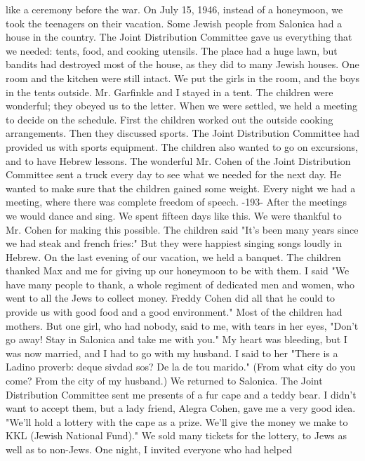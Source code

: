 like a ceremony before the war. 
On July 15, 1946, instead of a honeymoon, we took the teenagers on their vacation. 
Some Jewish people from Salonica had a house in the country. The Joint Distribution 
Committee gave us everything that we needed: tents, food, and cooking utensils. The 
place had a huge lawn, but bandits had destroyed most of the house, as they did to many 
Jewish houses. One room and the kitchen were still intact. 
We put the girls in the room, and the boys in the tents outside. Mr. Garfinkle and 
I stayed in a tent. The children were wonderful; they obeyed us to the letter. When 
we were settled, we held a meeting to decide on the schedule. First the children worked out the outside cooking arrangements. Then they discussed sports. The Joint Distribution Committee had provided us with sports equipment. The children also wanted 
to go on excursions, and to have Hebrew lessons. 
The wonderful Mr. Cohen of the Joint Distribution Committee sent a truck every day 
to see what we needed for the next day. He wanted to make sure that the children gained 
some weight. Every night we had a meeting, where there was complete freedom of speech. 
-193- 
After the meetings we would dance and sing. We spent fifteen days like this. We were 
thankful to Mr. Cohen for making this possible. The children said "It's been many years since we had steak and french fries:" But they were happiest singing songs loudly in Hebrew. 
On the last evening of our vacation, we held a banquet. The children thanked Max 
and me for giving up our honeymoon to be with them. I said "We have many people to 
thank, a whole regiment of dedicated men and women, who went to all the Jews to collect 
money. Freddy Cohen did all that he could to provide us with good food and a good environment." 
Most of the children had mothers. But one girl, who had nobody, said to me, with 
tears in her eyes, "Don't go away! Stay in Salonica and take me with you." My heart 
was bleeding, but I was now married, and I had to go with my husband. I said to her 
"There is a Ladino proverb: deque sivdad sos? De la de tou marido." (From what city 
do you come? From the city of my husband.) 
We returned to Salonica. The Joint Distribution Committee sent me presents of a 
fur cape and a teddy bear. I didn't want to accept them, but a lady friend, Alegra Cohen, gave me a very good idea. "We'll hold a lottery with the cape as a prize. We'll 
give the money we make to KKL (Jewish National Fund)." We sold many tickets for the 
lottery, to Jews as well as to non-Jews. One night, I invited everyone who had helped 
